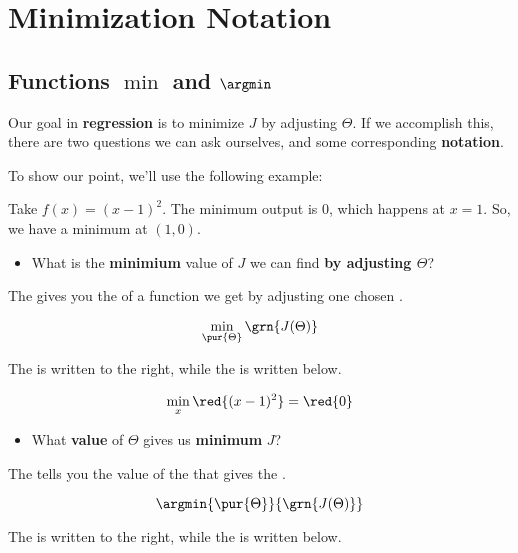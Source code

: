 \section*{Minimization Notation}

\subsection*{Functions $\min$ and $\argmin$}
    
    Our goal in \textbf{regression} is to minimize $J$ by adjusting $\Theta$. If we accomplish this, there are two questions we can ask ourselves, and some corresponding \textbf{notation}.
    
    To show our point, we'll use the following example:
    
    \miniex Take $f(x)=(x-1)^2$. The minimum output is 0, which happens at $x=1$. So, we have a minimum at $(1, 0)$.
    
    \begin{itemize}
        \item What is the \textbf{minimium} value of $J$ we can find \textbf{by adjusting $\Theta$}?
    \end{itemize}
    
    \begin{notation}
        The  gives you the  of a function we get by adjusting one chosen .
        
        \begin{equation*}
            \min_{ \pur{ \Theta } }{ \grn{ J(\Theta) } }
        \end{equation*}
        
        The  is written to the right, while the  is written below.
    
    \end{notation}
    
    \miniex 
    
    \begin{equation}
        \min_x{ \red{(x-1)^2} } = \red{0}
    \end{equation}
    
    \begin{itemize}
        \item What \textbf{value} of $\Theta$ gives us \textbf{minimum} $J$?
    \end{itemize}
    
    \begin{notation}
        The  tells you the value of the  that gives the .
        
        \begin{equation*}
            \argmin{ \pur{ \Theta } }{ \grn{ J(\Theta) } }
        \end{equation*}
        
        The  is written to the right, while the  is written below.
    
    \end{notation}
    
